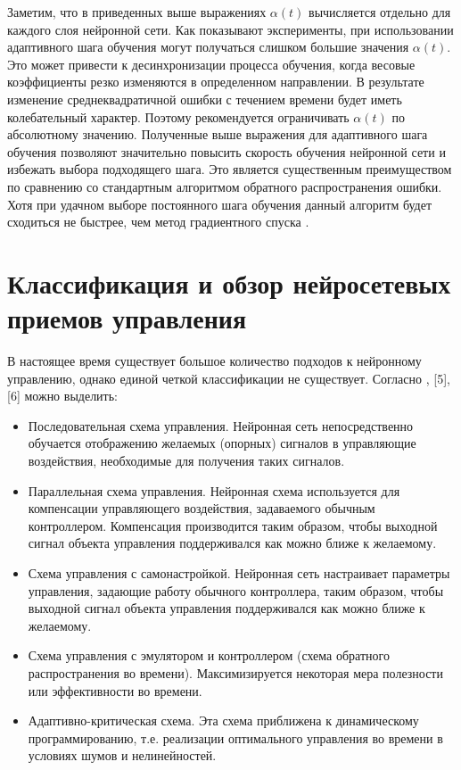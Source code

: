 Заметим, что в приведенных выше выражениях $\alpha(t)$ вычисляется отдельно для каждого слоя нейронной сети. Как показывают эксперименты, при использовании адаптивного шага обучения могут получаться слишком большие значения $\alpha(t)$. Это может привести к десинхронизации процесса обучения, когда весовые коэффициенты резко изменяются в определенном направлении. В результате изменение среднеквадратичной ошибки с течением времени будет иметь колебательный характер. Поэтому рекомендуется ограничивать $\alpha(t)$ по абсолютному значению. Полученные выше выражения для адаптивного шага обучения позволяют значительно повысить скорость обучения нейронной сети и избежать выбора подходящего шага. Это является существенным преимуществом по сравнению со стандартным алгоритмом обратного распространения ошибки. Хотя при удачном выборе постоянного шага обучения данный алгоритм будет сходиться не быстрее, чем метод градиентного спуска \cite{Golovko_2001}.

\section{Классификация и обзор нейросетевых приемов управления}

В настоящее время существует большое количество подходов к нейронному управлению, однако единой четкой классификации не существует. Согласно \cite{Omatu_Khalid_Yusof}, [5], [6] можно выделить:

\begin{itemize}
    \item Последовательная схема управления. Нейронная сеть непосредственно обучается отображению желаемых (опорных) сигналов в управляющие воздействия, необходимые для получения таких сигналов.
    \item Параллельная схема управления. Нейронная схема используется для компенсации управляющего воздействия, задаваемого обычным контроллером. Компенсация производится таким образом, чтобы выходной сигнал объекта управления поддерживался как можно ближе к желаемому.
    \item Схема управления с самонастройкой. Нейронная сеть настраивает параметры управления, задающие работу обычного контроллера, таким образом, чтобы выходной сигнал объекта управления поддерживался как можно ближе к желаемому.
    \item Схема управления с эмулятором и контроллером (схема обратного распространения во времени). Максимизируется некоторая мера полезности или эффективности во времени.
    \item Адаптивно-критическая схема. Эта схема приближена к динамическому программированию, т.е. реализации оптимального управления во времени в условиях шумов и нелинейностей.
\end{itemize}

